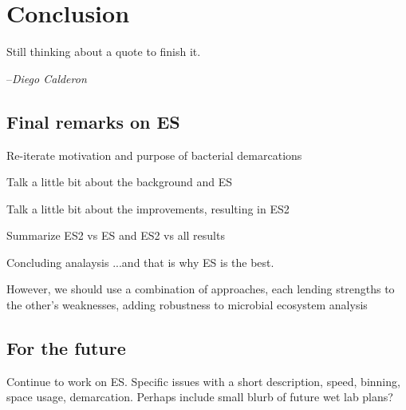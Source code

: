 \chapter{Conclusion}

\begin{shadequote}
Still thinking about a quote to finish it. \par--\emph{Diego Calderon}
\end{shadequote}


\section{Final remarks on ES}

Re-iterate motivation and purpose of bacterial demarcations


Talk a little bit about the background and ES

Talk a little bit about the improvements, resulting in ES2

Summarize ES2 vs ES and ES2 vs all results

Concluding analaysis
...and that is why ES is the best.

However, we should use a combination of approaches, each lending strengths to the other's weaknesses, adding robustness to microbial ecosystem analysis~\cite{bohannan2003new}

\section{For the future}
Continue to work on ES.
Specific issues with a short description, speed, binning, space usage, demarcation.
Perhaps include small blurb of future wet lab plans?